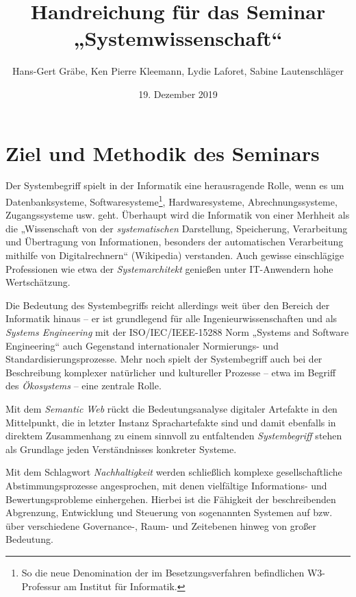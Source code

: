 \documentclass[11pt,a4paper]{article}
\title{Handreichung für das Seminar „Systemwissenschaft“}
\author{Hans-Gert Gr\"abe, Ken Pierre Kleemann, Lydie Laforet, Sabine
  Lautenschläger}
\date{19. Dezember 2019}
\begin{document}
\maketitle

\section{Ziel und Methodik des Seminars}

Der Systembegriff spielt in der Informatik eine herausragende Rolle, wenn es
um Datenbanksysteme, Softwaresysteme\footnote{So die neue Denomination der im
  Besetzungsverfahren befindlichen W3-Professur am Institut für Informatik.},
Hardwaresysteme, Abrechnungssysteme, Zugangssysteme usw. geht.  Überhaupt wird
die Informatik von einer Merhheit als die „Wissenschaft von der
\emph{systematischen} Darstellung, Speicherung, Verarbeitung und Übertragung
von Informationen, besonders der automatischen Verarbeitung mithilfe von
Digitalrechnern“ (Wikipedia) verstanden.  Auch gewisse einschlägige
Professionen wie etwa der \emph{Systemarchitekt} genießen unter IT-Anwendern
hohe Wertschätzung.

Die Bedeutung des Systembegriffs reicht allerdings weit über den Bereich der
Informatik hinaus -- er ist grundlegend für alle Ingenieurwissenschaften und
als \emph{Systems Engineering} mit der ISO/IEC/IEEE-15288 Norm „Systems and
Software Engineering“ auch Gegenstand internationaler Normierungs- und
Standardisierungsprozesse.  Mehr noch spielt der Systembegriff auch bei der
Beschreibung komplexer natürlicher und kultureller Prozesse -- etwa im Begriff
des \emph{Ökosystems} -- eine zentrale Rolle.

Mit dem \emph{Semantic Web} rückt die Bedeutungsanalyse digitaler Artefakte in
den Mittelpunkt, die in letzter Instanz Sprachartefakte sind und damit
ebenfalls in direktem Zusammenhang zu einem sinnvoll zu entfaltenden
\emph{Systembegriff} stehen als Grundlage jeden Verständnisses konkreter
Systeme.

Mit dem Schlagwort \emph{Nachhaltigkeit} werden schließlich komplexe
gesellschaftliche Abstimmungsprozesse angesprochen, mit denen vielfältige
Informations- und Bewertungsprobleme einhergehen. Hierbei ist die Fähigkeit
der beschreibenden Abgrenzung, Entwicklung und Steuerung von sogenannten
Systemen auf bzw. über verschiedene Governance-, Raum- und Zeitebenen hinweg
von großer Bedeutung.
\end{document}
